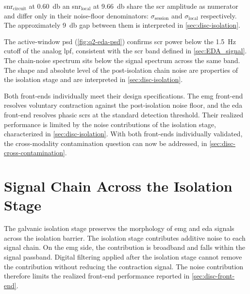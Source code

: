 \gls{snr}$_{\text{circuit}}$ at \SI{0.60}{\decibel} an \gls{snr}$_{\text{local}}$ at \SI{9.66}{\decibel} share the \gls{scr} amplitude as numerator and differ only in their noise-floor denominators: $\sigma_\text{session}$ and $\sigma_\text{local}$ respectively. The approximately \SI{9}{\decibel} gap between them is interpreted in \autoref{sec:disc-isolation}.


The active-window \gls{psd} (\autoref{fig:q2-eda-psd}) confirms \gls{scr} power below the \SI{1.5}{\hertz} cutoff of the analog \gls{lpf}, consistent with the \gls{scr} band defined in \autoref{sec:EDA_signal}. The chain-noise spectrum sits below the signal spectrum across the same band. The shape and absolute level of the post-isolation chain noise are properties of the isolation stage and are interpreted in \autoref{sec:disc-isolation}.




Both front-ends individually meet their design specifications. The \gls{emg} front-end resolves voluntary contraction against the post-isolation noise floor, and the \gls{eda} front-end resolves phasic \glspl{scr} at the standard detection threshold. Their realized performance is limited by the noise contributions of the isolation stage, characterized in \autoref{sec:disc-isolation}. With both front-ends individually validated, the cross-modality contamination question can now be addressed, in \autoref{sec:disc-cross-contamination}.




\section{Signal Chain Across the Isolation Stage}
\label{sec:disc-isolation}

The galvanic isolation stage preserves the morphology of \gls{emg} and \gls{eda} signals across the isolation barrier. The isolation stage contributes additive noise to each signal chain. On the \gls{emg} side, the contribution is broadband and falls within the signal passband. Digital filtering applied after the isolation stage cannot remove the contribution without reducing the contraction signal. The noise contribution therefore limits the realized front-end performance reported in \autoref{sec:disc-front-end}.

